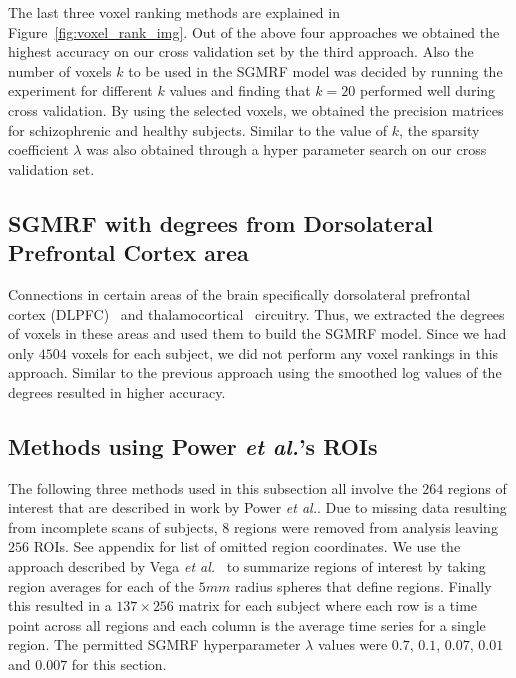 \documentclass{article} %
\begin{document}
The last three voxel ranking methods are explained in Figure~\ref{fig:voxel_rank_img}. 
Out of the above four approaches we obtained the highest accuracy on our cross 
validation set by the third approach. Also the number of voxels $k$ to be used 
in the SGMRF model was decided by running the experiment for different $k$ 
values and finding that $k = 20$ performed well during cross validation. By using the selected voxels, we obtained the precision matrices for schizophrenic and healthy subjects. Similar to the value of $k$, the sparsity coefficient 
$\lambda$ was also obtained through a hyper parameter search on our cross 
validation set.


\subsection{SGMRF with degrees from Dorsolateral Prefrontal Cortex area}
Connections in certain areas of the brain specifically dorsolateral 
prefrontal cortex (DLPFC)~\cite{Potkin2008} and 
thalamocortical~\cite{Cheng2015} circuitry. Thus, we extracted the degrees 
of voxels in these areas and used them to build the SGMRF model. Since we 
had only $4504$ voxels for each subject, we did not perform any voxel 
rankings in this approach. Similar to the previous approach using the 
smoothed log values of the degrees resulted in higher accuracy.

\subsection{Methods using Power \emph{et al.}'s ROIs}

The following three methods used in this subsection all involve the $264$  
regions of interest that are described in work by Power \emph{et al.}.
Due to missing data resulting from incomplete scans of subjects, $8$
regions were removed from analysis leaving $256$ ROIs. See appendix for
list of omitted region coordinates. We use the
approach described by Vega \emph{et al.}~\cite{rvega} to summarize
regions of interest by taking region averages for each of the $5mm$ radius
spheres that define regions. Finally this resulted in a $137 \times 256$ matrix
for each subject where each row is a time point across all regions and each
column is the average time series for a single region. The permitted SGMRF 
hyperparameter $\lambda$ values were $0.7$, $0.1$, $0.07$, $0.01$ and 
$0.007$ for this section.
\end{document}
